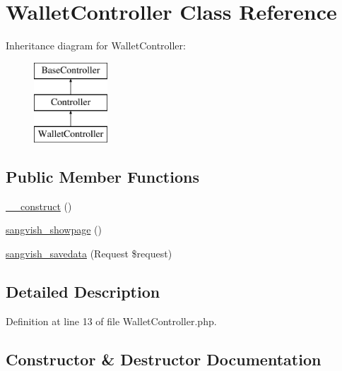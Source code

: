 \hypertarget{class_responsive_1_1_http_1_1_controllers_1_1_wallet_controller}{}\section{Wallet\+Controller Class Reference}
\label{class_responsive_1_1_http_1_1_controllers_1_1_wallet_controller}
Inheritance diagram for Wallet\+Controller\+:\begin{figure}[H]
\begin{center}
\leavevmode
\includegraphics[height=3.000000cm]{class_responsive_1_1_http_1_1_controllers_1_1_wallet_controller}
\end{center}
\end{figure}
\subsection*{Public Member Functions}
\begin{DoxyCompactItemize}
\item 
\mbox{\hyperlink{class_responsive_1_1_http_1_1_controllers_1_1_wallet_controller_a095c5d389db211932136b53f25f39685}{\+\_\+\+\_\+construct}} ()
\item 
\mbox{\hyperlink{class_responsive_1_1_http_1_1_controllers_1_1_wallet_controller_ae5a8b5289e68974315c61e6e9f0e6494}{sangvish\+\_\+showpage}} ()
\item 
\mbox{\hyperlink{class_responsive_1_1_http_1_1_controllers_1_1_wallet_controller_a63d8d498a130e9f530dd9de0247a0c74}{sangvish\+\_\+savedata}} (Request \$request)
\end{DoxyCompactItemize}


\subsection{Detailed Description}


Definition at line 13 of file Wallet\+Controller.\+php.



\subsection{Constructor \& Destructor Documentation}
\mbox{\label{class_responsive_1_1_http_1_1_controllers_1_1_wallet_controller_a095c5d389db211932136b53f25f39685}} 
